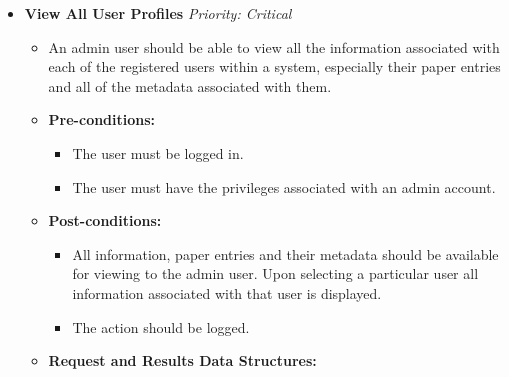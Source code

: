 \documentclass{article}
\begin{document}
\begin{itemize}
					\item \textbf{View All User Profiles} \hfill \textit{Priority: Critical}
					\begin{itemize}
						\item An admin user should be able to view all the information associated with each of the registered users within a system, especially their paper entries and all of the metadata associated with them.
						\item \textbf{Pre-conditions:}
						\begin{itemize}
							\item The user must be logged in.
							\item The user must have the privileges associated with an admin account.
						\end{itemize}
						\item \textbf{Post-conditions:}
						\begin{itemize}
							\item All information, paper entries and their metadata should be available for viewing to the admin user. Upon selecting a particular user all information associated with that user is displayed.
							\item The action should be logged.
						\end{itemize}
						\item \textbf{Request and Results Data Structures:}
					\end{itemize}
				\end{itemize}
\end{document}
